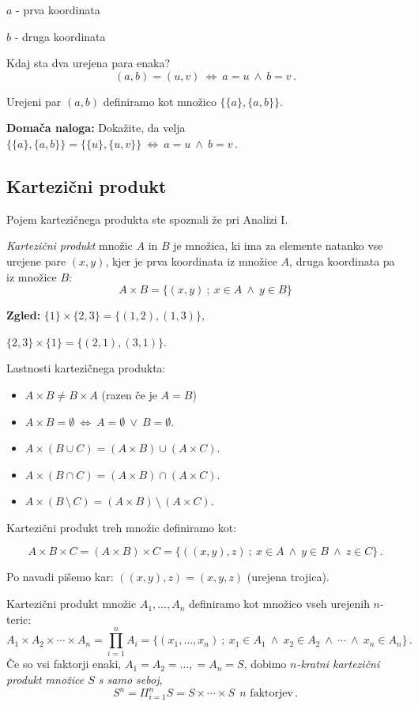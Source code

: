 \documentclass[11pt,paper=b5,DIV=13,headinclude,footinclude]{scrbook}
\def\ali {{~\vee~}}
\def\inn {{~\wedge~}}
\def\brez {{\,\setminus\,}}
\def\cee {{~\Leftrightarrow~}}
\begin{document}
$a$ - prva koordinata

$b$ - druga koordinata

Kdaj sta dva urejena para enaka?
$$(a,b) = (u,v) \cee a = u \inn b = v\,.$$

\medskip
Urejeni par $(a,b)$ definiramo kot množico $\{\{a\},\{a,b\}\}$.

\medskip
\textbf{ Domača naloga:}
Dokažite, da velja $\{\{a\},\{a,b\}\} = \{\{u\},\{u,v\}\}\cee a = u \inn b = v\,.$



\subsection{Kartezični produkt}

Pojem kartezičnega produkta ste spoznali že pri Analizi I.

{\em Kartezični produkt} množic $A$ in $B$ je množica, ki ima za elemente natanko vse urejene pare $(x,y)$, kjer je prva koordinata iz množice $A$, druga koordinata pa iz množice $B$:
$$A\times B = \{(x,y)~;~x\in A\inn y\in B\}$$



\textbf{ Zgled:} $\{1\}\times \{2,3\} = \{(1,2),(1,3)\}$,

$\{2,3\}\times \{1\} = \{(2,1),(3,1)\}$.

\bigskip
Lastnosti kartezičnega produkta:
\begin{itemize}
  \item $A\times B\neq B\times A$ (razen če je $A = B$)
  \item $A\times B = \emptyset \cee A= \emptyset \ali B = \emptyset$.
  \item $A\times (B\cup C) = (A\times B) \cup (A\times C)$.
  \item $A\times (B\cap C) = (A\times B) \cap (A\times C)$.
  \item $A\times (B\brez C) = (A\times B) \brez (A\times C)$.
\end{itemize}

Kartezični produkt treh množic definiramo kot:

$$A\times B\times C = (A\times B)\times C= \{((x,y),z)~;~x\in A \inn y\in B\inn z\in C\}\,.$$

Po navadi pišemo kar: $((x,y),z) = (x,y,z)$ (urejena trojica).

\bigskip
Kartezični produkt množic $A_1,\ldots, A_n$ definiramo kot
množico vseh urejenih $n$-teric:
$$A_1\times A_2\times\cdots \times A_n = \prod_{i = 1}^n A_i = \{(x_1,\ldots, x_n)~;~x_1\in A_1\inn x_2\in A_2\inn\cdots \inn x_n\in A_n\}\,.$$
Če so vsi faktorji enaki, $A_1 = A_2 = \ldots,  = A_n = S$, dobimo {\em $n$-kratni kartezični produkt množice $S$ s samo seboj},
$$S^n = \Pi_{i = 1}^nS = S\times\cdots\times S~~\textrm{$n$ faktorjev}\,.$$
\end{document}
